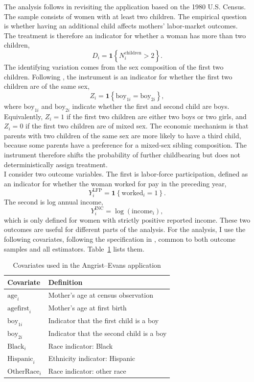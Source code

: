 \documentclass[12pt, a4paper, oneside]{article}
\theoremstyle{plain}
\theoremstyle{definition}
\newcommand{\indic}{\mathbf{1}}
\begin{document}
The analysis follows \citet{sloczynski2025abadie} in revisiting the \citet{angrist1996children} application based on the 1980 U.S. Census.
The sample consists of women with at least two children. The empirical question is whether having an additional child affects mothers' labor-market outcomes. The treatment is therefore an indicator for whether a woman has more than two children,
\[
    D_i = \indic\!\left\{N_i^{\text{children}} > 2\right\}.
\]
The identifying variation comes from the sex composition of the first two children. Following \citet{angrist1996children}, the instrument is an indicator for whether the first two children are of the same sex,
\[
    Z_i = \indic\!\left\{\text{boy}_{1i} = \text{boy}_{2i}\right\},
\]
where $\text{boy}_{1i}$ and $\text{boy}_{2i}$ indicate whether the first and second child are boys. Equivalently, $Z_i=1$ if the first two children are either two boys or two girls, and $Z_i=0$ if the first two children are of mixed sex.
The economic mechanism is that parents with two children of the same sex are more likely to have a third child, because some parents have a preference for a mixed-sex sibling composition. The instrument therefore shifts the probability of further childbearing but does not deterministically assign treatment. \\
I consider two outcome variables. The first is labor-force participation, defined as an indicator for whether the woman worked for pay in the preceding year,
\[
    Y_i^{\text{LFP}} = \indic\!\left\{\text{worked}_i = 1\right\}.
\]
The second is log annual income,
\[
    Y_i^{\text{INC}} = \log\!\left(\text{income}_i\right),
\]
which is only defined for women with strictly positive reported income. These two outcomes are useful for different parts of the analysis.
For the analysis, I use the following covariates, following the specification in \citet{sloczynski2025abadie}, common to both outcome samples and all estimators. Table~\ref{tab:ae_child_covariates} lists them.

\begin{table}[htbp]
\centering
\caption{Covariates used in the Angrist--Evans application}
\label{tab:ae_child_covariates}
\small
\begin{tabular}{ll}
\toprule
Covariate & Definition \\
\midrule
$\text{age}_i$        & Mother's age at census observation \\
$\text{agefirst}_i$   & Mother's age at first birth \\
$\text{boy}_{1i}$     & Indicator that the first child is a boy \\
$\text{boy}_{2i}$     & Indicator that the second child is a boy \\
$\text{Black}_i$      & Race indicator: Black \\
$\text{Hispanic}_i$   & Ethnicity indicator: Hispanic \\
$\text{OtherRace}_i$  & Race indicator: other race \\
\bottomrule
\end{tabular}
\end{table}
\end{document}
